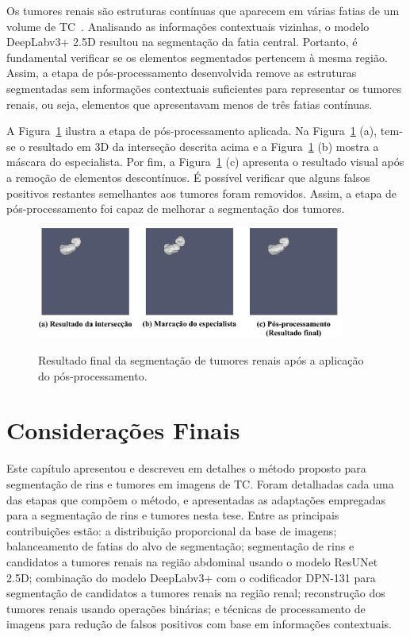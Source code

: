 Os tumores renais são estruturas contínuas que aparecem em várias fatias de um volume de TC~\cite{urology_health,urology_care}. Analisando as informações contextuais vizinhas, o modelo DeepLabv3+ 2.5D resultou na segmentação da fatia central. Portanto, é fundamental verificar se os elementos segmentados pertencem à mesma região. Assim, a etapa de pós-processamento desenvolvida remove as estruturas segmentadas sem informações contextuais suficientes para representar os tumores renais, ou seja, elementos que apresentavam menos de três fatias contínuas.

A Figura~\ref{fig:seg-final-tumores} ilustra a etapa de pós-processamento aplicada. Na Figura~\ref{fig:seg-final-tumores} (a), tem-se o resultado em 3D da interseção descrita acima e a Figura~\ref{fig:seg-final-tumores} (b) mostra a máscara do especialista. Por fim, a Figura~\ref{fig:seg-final-tumores} (c) apresenta o resultado visual após a remoção de elementos descontínuos. É possível verificar que alguns falsos positivos restantes semelhantes aos tumores foram removidos. Assim, a etapa de pós-processamento foi capaz de melhorar a segmentação dos tumores.

\begin{figure}[!ht]
    \centering
    \caption{Resultado final da segmentação de tumores renais após a aplicação do pós-processamento.}
    \includegraphics[width=0.9\textwidth]{figuras/tumor-final.pdf}
    \label{fig:seg-final-tumores}
\end{figure}

\section{Considerações Finais}
\label{consideracoes-finais-metodo}

Este capítulo apresentou e descreveu em detalhes o método proposto para segmentação de rins e tumores em imagens de TC. Foram detalhadas cada uma das etapas que compõem o método, e apresentadas as adaptações empregadas para a segmentação de rins e tumores nesta tese. Entre as principais contribuições estão: a distribuição proporcional da base de imagens; balanceamento de fatias do alvo de segmentação; segmentação de rins e candidatos a tumores renais na região abdominal usando o modelo ResUNet 2.5D; combinação do modelo DeepLabv3+ com o codificador DPN-131 para segmentação de candidatos a tumores renais na região renal; reconstrução dos tumores renais usando operações binárias; e técnicas de processamento de imagens para redução de falsos positivos com base em informações contextuais.


